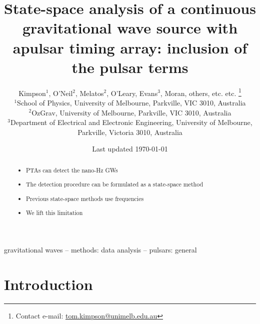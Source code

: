 \documentclass[fleqn,usenatbib,useAMS]{mnras}
\title[Stochastic Kalman PTA]{State-space analysis of a continuous gravitational wave source with apulsar timing array: inclusion of the pulsar terms}
\author[Kimpson]{Kimpson$^{1}$, O'Neil$^{2}$, Melatos$^{2}$, O'Leary, Evans$^{3}$, Moran, others, etc. etc.%
\thanks{Contact e-mail: \href{tom.kimpson@unimelb.edu.au}{tom.kimpson@unimelb.edu.au}}%
\\
$^{1}$School of Physics, University of Melbourne, Parkville, VIC 3010, Australia \\
$^{2}$OzGrav, University of Melbourne, Parkville, VIC 3010, Australia \\
$^{3}$Department of Electrical and Electronic Engineering, University of Melbourne, Parkville, Victoria 3010, Australia }
\date{Last updated \today}
\begin{document}
\label{firstpage}
\pagerange{\pageref{firstpage}--\pageref{lastpage}}
\maketitle

\begin{abstract}	
\begin{itemize}
	\item PTAs can detect the nano-Hz GWs 
	\item The detection procedure can be formulated as a state-space method
	\item Previous state-space methods use frequencies
	\item We lift this limitation
\end{itemize}
\end{abstract}

\begin{keywords}
gravitational waves -- methods: data analysis -- pulsars: general
\end{keywords}



\begingroup
\let\clearpage\relax
\endgroup
\newpage




\section{Introduction}\label{sec:intro}
\end{document}
